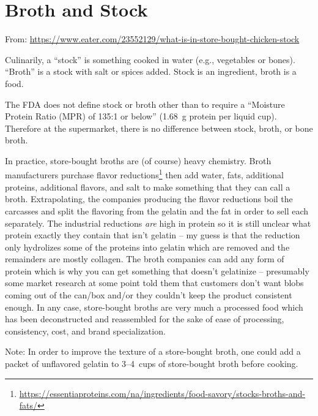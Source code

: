 
\section{Broth and Stock}
{\footnotesize From: \url{https://www.eater.com/23552129/what-is-in-store-bought-chicken-stock}}

Culinarily, a ``stock'' is something cooked in water (e.g., vegetables or bones).
``Broth'' is a stock with salt or spices added. Stock is an ingredient, broth is a
food.

The FDA does not define stock or broth other than to require a ``Moisture Protein
Ratio (MPR) of 135:1 or below'' (\qty{1.68}{g} protein per liquid cup). Therefore at
the supermarket, there is no difference between stock, broth, or bone broth.

In practice, store-bought broths are (of course) heavy chemistry. Broth manufacturers
purchase flavor
reductions\footnote{\url{https://essentiaproteins.com/na/ingredients/food-savory/stocks-broths-and-fats/}}
then add water, fats, additional proteins, additional flavors, and salt to make
something that they can call a broth. Extrapolating, the companies producing the
flavor reductions boil the carcasses and split the flavoring from the gelatin and the
fat in order to sell each separately. The industrial reductions \textsl{are} high in
protein so it is still unclear what protein exactly they contain that isn't gelatin
-- my guess is that the reduction only hydrolizes some of the proteins into gelatin
which are removed and the remainders are mostly collagen. The broth companies can add
any form of protein which is why you can get something that doesn't gelatinize --
presumably some market research at some point told them that customers don't want
blobs coming out of the can/box and/or they couldn't keep the product consistent
enough. In any case, store-bought broths are very much a processed food which has
been deconstructed and reassembled for the sake of ease of processing, consistency,
cost, and brand specialization.

Note: In order to improve the texture of a store-bought broth, one could add a packet
of unflavored gelatin to 3--4~cups of store-bought broth before cooking.


